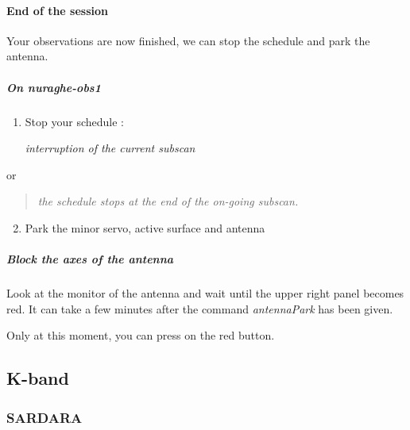 \documentclass[letterpaper,10pt,english]{sphinxmanual}
\begin{document}
\paragraph{End of the session}
\label{SpectralLine/C-band/Xarcos/stop-session:end-of-the-session}\label{SpectralLine/C-band/Xarcos/stop-session::doc}
Your observations are now finished, we can stop the schedule and park
the antenna.


\subparagraph{On nuraghe-obs1}
\label{SpectralLine/C-band/Xarcos/stop-session:on-nuraghe-obs1}\begin{enumerate}
\item {} 
Stop your schedule :

   \emph{interruption of the current subscan}

\end{enumerate}

or
\begin{quote}

    \emph{the schedule stops at the end of the on-going subscan.}
\end{quote}
\begin{enumerate}
\setcounter{enumi}{1}
\item {} 
Park the minor servo, active surface and antenna





\end{enumerate}


\subparagraph{Block the axes of the antenna}
\label{SpectralLine/C-band/Xarcos/stop-session:block-the-axes-of-the-antenna}
Look at the monitor of the antenna and wait until the upper right
panel becomes red. It can take a few minutes after the command
\emph{antennaPark} has been given.

Only at this moment, you can press on the red button.


\subsection{K-band}
\label{SpectralLine/K-band/index::doc}\label{SpectralLine/K-band/index:k-band}

\subsubsection{SARDARA}
\label{SpectralLine/K-band/SARDARA/index:sardara}\label{SpectralLine/K-band/SARDARA/index::doc}
\end{document}
